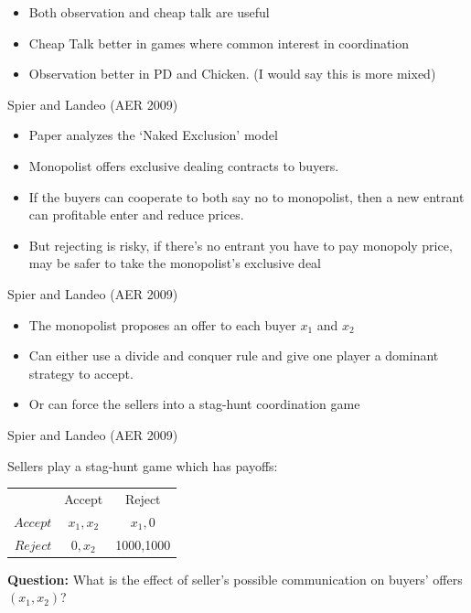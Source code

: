 \documentclass{beamer}
\begin{document}
\begin{frame}
\begin{card}[Conclusions]
\begin{itemize}
	\item Both observation and cheap talk are useful
	\item Cheap Talk better in games where common interest in coordination
	\item Observation better in PD and Chicken. (I would say this is more mixed)
\end{itemize}
\end{card}
\end{frame}

\begin{frame}{Spier and Landeo (AER 2009)}
\begin{card}
	\begin{itemize}
		\item Paper analyzes the `Naked Exclusion' model
		\item Monopolist offers exclusive dealing contracts to buyers.
		\item If the buyers can cooperate to both say no to monopolist, then a new entrant can profitable enter and reduce prices.
		\item But rejecting is risky, if there's no entrant you have to pay monopoly price, may be safer to take the monopolist's exclusive deal
	\end{itemize}
\end{card}
\end{frame}
\begin{frame}{Spier and Landeo (AER 2009)}
	\begin{itemize}
		\item The monopolist proposes an offer to each buyer $x_1$ and $x_2$
		\item Can either use a divide and conquer rule and give one player a dominant strategy to accept.
		\item Or can force the sellers into a stag-hunt coordination game
	\end{itemize}
\end{frame}

\begin{frame}{Spier and Landeo (AER 2009)}
\begin{card}
Sellers play a stag-hunt game which has payoffs:
	\begin{center}
		\begin{tabular}{r|c|c|}
			\multicolumn{1}{r}{} & \multicolumn{1}{c}{Accept} & \multicolumn{1}{c}{Reject} \\ \cline{2-3}
			$Accept$ &  $x_1,x_2$ & $x_1,0$  \\ \cline{2-3}
			$Reject$ &  $0,x_2$ & 1000,1000  \\ \cline{2-3}
		\end{tabular}
	\end{center}
\end{card}

\begin{card}
	\textbf{Question:} What is the effect of seller's possible communication on buyers' offers $(x_1,x_2)$?
\end{card}
\end{frame}
\end{document}
